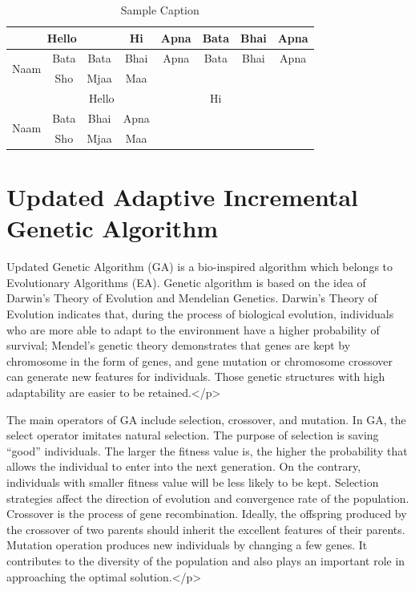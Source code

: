 \documentclass[conference]{IEEEtran}%
\begin{document}
\begin{table}[htbp]
\caption{Sample Caption}
\begin{center}
\begin{tabular}{|c|c|c|c|c|c|c|c|}
\hline
  \multicolumn{3}{|c|}{Hello} & Hi & Apna & Bata & Bhai & Apna  \\
\hline
  \multirow{2}{*}{Naam} & Bata & Bata & Bhai & Apna & Bata & Bhai & Apna  \\
\hhline{~-------}
   & Sho & Mjaa & Maa &  &  &  &   \\
\hline
  \multicolumn{5}{|c|}{Hello} & Hi &  &   \\
\hline
  \multirow{2}{*}{Naam} & Bata & Bhai & Apna &  &  &  &   \\
\hhline{~-------}
   & Sho & Mjaa & Maa &  &  &  &   \\
\hline

\end{tabular}
\label{table}
\end{center}
\end{table}

%
\section{Updated Adaptive Incremental Genetic Algorithm}%
\label{sec:UpdatedAdaptiveIncrementalGeneticAlgorithm}%
Updated Genetic Algorithm (GA) is a bio-inspired algorithm which belongs to Evolutionary Algorithms (EA). Genetic algorithm is based on the idea of Darwin’s Theory of Evolution and Mendelian Genetics. Darwin’s Theory of Evolution indicates that, during the process of biological evolution, individuals who are more able to adapt to the environment have a higher probability of survival; Mendel’s genetic theory demonstrates that genes are kept by chromosome in the form of genes, and gene mutation or chromosome crossover can generate new features for individuals. Those genetic structures with high adaptability are easier to be retained.</p>

 The main operators of GA include selection, crossover, and mutation. In GA, the select operator imitates natural selection. The purpose of selection is saving “good” individuals. The larger the fitness value is, the higher the probability that allows the individual to enter into the next generation. On the contrary, individuals with smaller fitness value will be less likely to be kept. Selection strategies affect the direction of evolution and convergence rate of the population. Crossover is the process of gene recombination. Ideally, the offspring produced by the crossover of two parents should inherit the excellent features of their parents. Mutation operation produces new individuals by changing a few genes. It contributes to the diversity of the population and also plays an important role in approaching the optimal solution.</p>
\end{document}
